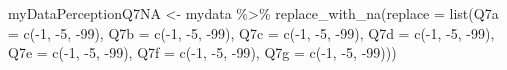\documentclass[
]{article}
\newenvironment{Shaded}{\begin{snugshade}}{\end{snugshade}}
\newcommand{\AttributeTok}[1]{\textcolor[rgb]{0.77,0.63,0.00}{#1}}
\newcommand{\DecValTok}[1]{\textcolor[rgb]{0.00,0.00,0.81}{#1}}
\newcommand{\FunctionTok}[1]{\textcolor[rgb]{0.00,0.00,0.00}{#1}}
\newcommand{\NormalTok}[1]{#1}
\newcommand{\OtherTok}[1]{\textcolor[rgb]{0.56,0.35,0.01}{#1}}
\newcommand{\SpecialCharTok}[1]{\textcolor[rgb]{0.00,0.00,0.00}{#1}}
\begin{document}
\begin{Shaded}
\begin{Highlighting}[]
\NormalTok{myDataPerceptionQ7NA }\OtherTok{\textless{}{-}}\NormalTok{ mydata }\SpecialCharTok{\%\textgreater{}\%} \FunctionTok{replace\_with\_na}\NormalTok{(}\AttributeTok{replace =} \FunctionTok{list}\NormalTok{(}\AttributeTok{Q7a =} \FunctionTok{c}\NormalTok{(}\SpecialCharTok{{-}}\DecValTok{1}\NormalTok{, }\SpecialCharTok{{-}}\DecValTok{5}\NormalTok{, }\SpecialCharTok{{-}}\DecValTok{99}\NormalTok{), }\AttributeTok{Q7b =} \FunctionTok{c}\NormalTok{(}\SpecialCharTok{{-}}\DecValTok{1}\NormalTok{, }\SpecialCharTok{{-}}\DecValTok{5}\NormalTok{, }\SpecialCharTok{{-}}\DecValTok{99}\NormalTok{), }\AttributeTok{Q7c =} \FunctionTok{c}\NormalTok{(}\SpecialCharTok{{-}}\DecValTok{1}\NormalTok{, }\SpecialCharTok{{-}}\DecValTok{5}\NormalTok{, }\SpecialCharTok{{-}}\DecValTok{99}\NormalTok{), }\AttributeTok{Q7d =} \FunctionTok{c}\NormalTok{(}\SpecialCharTok{{-}}\DecValTok{1}\NormalTok{, }\SpecialCharTok{{-}}\DecValTok{5}\NormalTok{, }\SpecialCharTok{{-}}\DecValTok{99}\NormalTok{), }\AttributeTok{Q7e =} \FunctionTok{c}\NormalTok{(}\SpecialCharTok{{-}}\DecValTok{1}\NormalTok{, }\SpecialCharTok{{-}}\DecValTok{5}\NormalTok{, }\SpecialCharTok{{-}}\DecValTok{99}\NormalTok{), }\AttributeTok{Q7f =} \FunctionTok{c}\NormalTok{(}\SpecialCharTok{{-}}\DecValTok{1}\NormalTok{, }\SpecialCharTok{{-}}\DecValTok{5}\NormalTok{, }\SpecialCharTok{{-}}\DecValTok{99}\NormalTok{), }\AttributeTok{Q7g =} \FunctionTok{c}\NormalTok{(}\SpecialCharTok{{-}}\DecValTok{1}\NormalTok{, }\SpecialCharTok{{-}}\DecValTok{5}\NormalTok{, }\SpecialCharTok{{-}}\DecValTok{99}\NormalTok{)))}


\end{Highlighting}
\end{Shaded}
\end{document}
